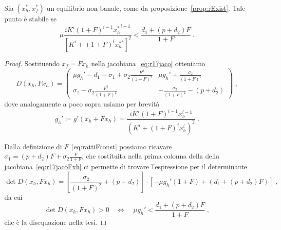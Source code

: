 \begin{proposizione}
    Sia $(x_h^*, x_f^*)$ un equilibrio non banale, come da proposizione~\ref{prop:rExist}.
    Tale punto è stabile se
    $$ \mu \frac{ i K^i (1+F)^{i-1}{x_h^*}^{i-1} }{ {\left[ K^i +(1+F)^i {x_h^*}^i \right]}^2 }
    < \frac{d_1 + (p+d_2)F}{1+F} \; .$$
    \label{prop:ratti2Dstab}
\end{proposizione}

\begin{proof}
    Sostituendo $x_f = F x_h$ nella jacobiana~\eqref{eq:r17jaco} otteniamo
    \begin{equation}
    D(x_h, F x_h) =
    \begin{pmatrix}
        \mu g_h' -d_1 - \sigma_1 + \sigma_2 \frac{F^2}{(1+F)^2}
        & \mu g_h' + \frac{\sigma_2}{(1+F)^2}
        \\
        \sigma_1 - \sigma_2 \frac{F^2}{(1+F)^2}
        & - \frac{\sigma_2}{(1+F)^2} - (p+d_2)
    \end{pmatrix} \; ,
    \label{eq:r17jacoFxh}
\end{equation}
dove analogamente a poco sopra usiamo per brevità
\begin{equation}
g_h' \coloneq g'( x_h + F x_h ) = \frac{i K^i {(1+F)}^{i-1} x_h^{i-1} }{ { \left( K^i + {(1+F)}^i x_h^i
        \right)  }^2 } \; .
    \label{eq:gPrimoF}
\end{equation}

Dalla definizione di $F$~\eqref{eq:rattiFconst} possiamo ricavare
$\sigma_1 = (p+d_2)F + \sigma_2 \frac{F}{1+F}$, che sostituita nella prima colonna della
della jacobiana~\eqref{eq:r17jacoFxh} ci permette di trovare l'espressione per il determinante
$$
\det D(x_h, F x_h) =
\left[ \frac{\sigma_2}{(1+F)^2} +(p+d_2) \right] \cdot
\left[ { - \mu g_h' (1+F) + \left( d_1 +(p+d_2)F \right) } \right]
\; ,
$$
da cui
$$
\det D(x_h, F x_h) > 0 \quad \iff \quad
\mu g_h' < \frac{d_1 + (p+d_2)F}{1+F} \; ,$$
che è la disequazione nella tesi.


\end{proof}
